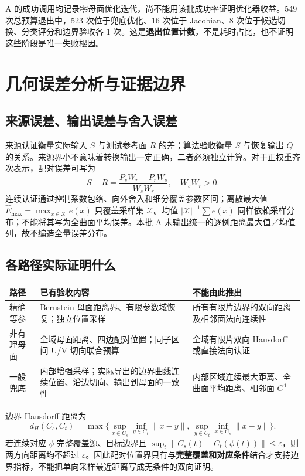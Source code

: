 \documentclass[UTF8,zihao=5,fontset=windows,a4paper]{ctexart}
\begin{document}
A 的成功调用均记录零母面优化迭代，尚不能用该批成功率证明优化器收益。549 次总预算退出中，523 次位于兜底优化、16 次位于 Jacobian、8 次位于候选切换、分类评分和边界验收各 1 次。这是\textbf{退出位置计数}，不是耗时占比，也不证明这些阶段是唯一失败根因。

\newpage
\section{几何误差分析与证据边界}
\subsection{来源误差、输出误差与舍入误差}
来源认证衡量实际输入 $S$ 与测试参考面 $R$ 的差；算法验收衡量 $S$ 与恢复输出 $Q$ 的关系。来源界小不意味着转换输出一定正确，二者必须独立计算。对于正权重齐次表示，配对误差可写为
\begin{equation}
S-R=\frac{P_sW_r-P_rW_s}{W_sW_r},\quad W_sW_r>0.
\end{equation}
连续认证通过控制系数包络、向外舍入和细分覆盖参数区间；离散最大值 $\widehat E_{\max}=\max_{x\in\mathcal X}e(x)$ 只覆盖采样集 $\mathcal X$。均值 $|\mathcal X|^{-1}\sum e(x)$ 同样依赖采样分布；不能将其写为全曲面平均误差。本批 A 未输出统一的逐例距离最大值／均值列，故不编造全量误差分布。

\subsection{各路径实际证明什么}
\begin{center}\small\renewcommand{\arraystretch}{1.18}
\begin{tabularx}{\linewidth}{@{}p{24mm}Y Y@{}}\toprule
路径 & 已有验收内容 & 不能由此推出\\\midrule
精确等参 & Bernstein 母面距离界、有限参数域恢复；独立位置采样 & 所有有限片边界的双向距离及相邻面法向连续性\\
非有理母面 & 全域母面距离、四边配对位置；同子区间 U/V 切向联合预算 & 全域有限片双向 Hausdorff 或直接法向认证\\
一般兜底 & 内部增强采样；实际导出的边界曲线连续位置、沿边切向、输出到母面的一致性 & 内部区域连续最大距离、全曲面平均距离、相邻面 $G^1$\\\bottomrule
\end{tabularx}
\end{center}
边界 Hausdorff 距离为
\begin{equation}
d_H(C_s,C_t)=\max\{\sup_{x\in C_s}\inf_{y\in C_t}\|x-y\|,\,
\sup_{y\in C_t}\inf_{x\in C_s}\|x-y\|\}.
\end{equation}
若连续对应 $\phi$ 完整覆盖源、目标边界且 $\sup_t\|C_s(t)-C_t(\phi(t))\|\le\varepsilon$，则两方向距离均不超过 $\varepsilon$。因此配对位置界只有与\textbf{完整覆盖和对应条件}结合才支持边界指标，不能把单向采样最近距离写成无条件的双向证明。
\end{document}
